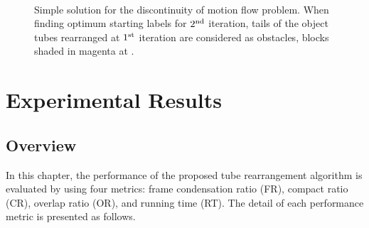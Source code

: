 \documentclass[11pt]{hyu_thesis}
\begin{document}
\begin{figure}
	\\
	\caption{Simple solution for the discontinuity of motion flow problem. When finding optimum starting labels for $2^{\rm{nd}}$ iteration, tails of the object tubes rearranged at $1^{\rm{st}}$ iteration are considered as obstacles, blocks shaded in magenta at \protect{}.}
	\label{fig:discontinuity}
\end{figure}

\chapter{Experimental Results}
\label{sec:exp}
\section{Overview}
In this chapter, the performance of the proposed tube rearrangement algorithm is evaluated by using four metrics: frame condensation ratio (FR), compact ratio (CR), overlap ratio (OR), and running time (RT). The detail of each performance metric is presented as follows.
\end{document}

